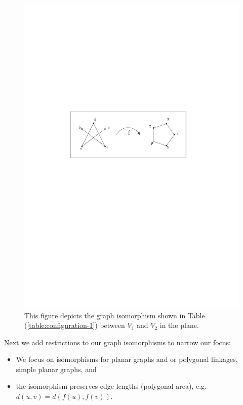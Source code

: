 \begin{figure}[!h]
\begin{center}
\includegraphics[scale=1]{graphics/graphIsomorphismExample.pdf}
\end{center} 
\caption{This figure depicts the graph isomorphism shown in Table 
(\ref{table:configuration-1}) between 
$V_1$ and $V_2$ in the plane.}
\label{fig:configuration-3}
\end{figure}
Next we add restrictions to our graph isomorphisms to narrow our focus:
\begin{itemize}
\item[\rn{1}] We focus on isomorphisms for planar graphs and or polygonal linkages, simple planar 
graphs, and
\item[\rn{2}] the isomorphism preserves edge lengths (polygonal area), e.g. $d(u,v) = d(f(u),f(v))$.
\end{itemize}  


















